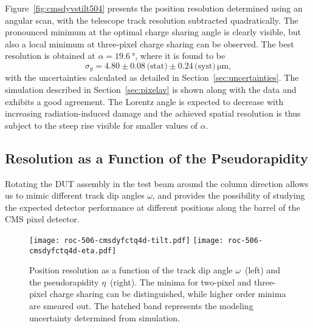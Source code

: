 \documentclass[a4paper,11pt]{article}
\newcommand{\SIERR}[4]{\ensuremath{\num{#1}\pm\num{#2}\,\text{(stat)}\pm\num{#3}\,\text{(syst)}\,\si{#4}}}
\begin{document}
Figure~\ref{fig:cmsdyvstilt504} presents the position resolution determined using an angular scan, with the telescope track resolution subtracted quadratically.
The pronounced minimum at the optimal charge sharing angle is clearly visible, but also a local minimum at three-pixel charge sharing can be observed.
The best resolution is obtained at $\alpha = \SI{19.6}{\degree}$, where it is found to be
$$ \sigma_y = \SIERR{4.80}{0.08}{0.24}{\micro\meter}\text{,}$$
with the uncertainties calculated as detailed in Section~\ref{sec:uncertainties}.
The simulation described in Section~\ref{sec:pixelav} is shown along with the data and exhibits a good agreement.
The Lorentz angle is expected to decrease with increasing radiation-induced damage and the achieved spatial resolution is thus subject to the steep rise visible for smaller values of $\alpha$.


\subsection{Resolution as a Function of the Pseudorapidity}
\label{sec:eta}

Rotating the DUT assembly in the test beam around the column direction allows us to mimic different track dip angles $\omega$, and provides the possibility of studying the expected detector performance at different positions along the barrel of the CMS pixel detector.

\begin{figure}[tbp]
  \centering
  \texttt{[image: roc-506-cmsdyfctq4d-tilt.pdf]}%
  \texttt{[image: roc-506-cmsdyfctq4d-eta.pdf]}%
  \caption[Position resolution as a function of the pseudorapidity]{Position resolution as a function of the track dip angle $\omega$~(left) and the pseudorapidity $\eta$~(right). The minima for two-pixel and three-pixel charge sharing can be distinguished, while higher order minima are smeared out. The hatched band represents the modeling uncertainty determined from simulation.}
  \label{fig:cmsdyvstilt506}
\end{figure}
\end{document}
